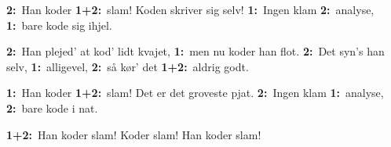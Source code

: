 \documentclass[danish]{article}
\newcommand{\et}{\textbf{1:}~}
\renewcommand{\to}{\textbf{2:}~}
\newcommand{\etto}{\textbf{1+2:}~}
\begin{document}
\begin{song}
\newpage

 \to{}Han koder \etto{}slam!
Koden skriver sig selv!
\et{}Ingen klam \to{}analyse,
\et{}bare kode sig ihjel.

\to{}Han plejed' at kod' lidt kvajet,
\et{}men nu koder han flot.
\to{}Det syn's han selv, \et{}alligevel,
\to{}så kør' det \etto{}aldrig godt.

\et{}Han koder \etto{}slam!
Det er det groveste pjat.
\to{}Ingen klam \et{}analyse,
\to{}bare kode i nat.

\etto{}Han koder slam!
Koder slam!
Han koder slam!

\end{song}
\end{document}
